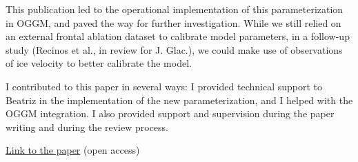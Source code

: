 This publication led to the operational implementation of this parameterization in OGGM, and paved the way for further
investigation. While we still relied on an external frontal ablation dataset to calibrate model parameters, in a
follow-up study (Recinos et al., in review for J. Glac.), we could make use of observations of ice velocity to better
calibrate the model.

I contributed to this paper in several ways: I provided technical support to Beatriz in the implementation of the new
parameterization, and I helped with the OGGM integration. I also provided support and supervision during the paper
writing and during the review process.

\href{https://doi.org/10.5194/tc-13-2657-2019}{Link to the paper} (open access)


\iflong  \else \fi 

